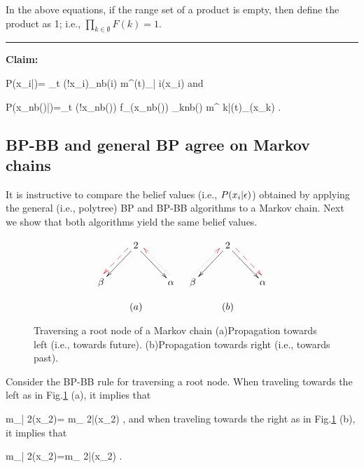 In the above
equations, if the
range set of a product is empty, then
 define the product as 1; i.e.,
$\prod_{k\in \emptyset}F(k)=1$.



\hrule\noindent
{\bf Claim:}

\beq
P(x_i|\eps)=
\lim_{t\rarrow
\infty}\caln(!x_i)\prod_{\alp\in nb(i)}
m^{(t)}_{\alp| i}(x_i)
\;
\label{eq-m-prod}
\eeq
and

\beq
P(x_{nb(\alp)}|\eps)=\lim_{t\rarrow \infty}
\caln(!x_{nb(\alp)})
f_\alp(x_{nb(\alp)})
\prod_{k\in nb(\alp)}
m^{ k|(t)}_{\alp}(x_k)
\;.
\label{eq-f-m-prod}
\eeq


\subsection{BP-BB and general BP agree on Markov chains}

It is instructive to
compare the belief values (i.e., $P(x_i|\epsilon)$)
obtained by
 applying the
general (i.e., polytree)  BP
and  BP-BB algorithms  to a Markov chain.
Next we show that both algorithms
yield the same belief values.

\begin{figure}[h!]
$$
\begin{array}{cc}
\xymatrix{
&2\ar[dr]\ar[dl]\ar@[red]@{-->}@<-1ex>[dl]
\\
\beta
&&\alp\ar@[red]@{.>}@<-1ex>[ul]
}
&
\xymatrix{
&2\ar[dr]\ar[dl]\ar@[red]@{-->}@<1ex>[dr]
\\
\beta\ar@[red]@{.>}@<1ex>[ur]
&&\alp
}
\\
\\
(a)&(b)
\end{array}
$$
\caption{Traversing a root node of a Markov chain
(a)Propagation towards left (i.e., towards future).
(b)Propagation towards right (i.e., towards past).}
\label{fig-mp-markov-trans-root}
\end{figure}

Consider
the BP-BB rule for traversing a root node.
When traveling
towards the left
as in Fig.\ref{fig-mp-markov-trans-root} (a),
it implies that

\beq
m_{\alp | 2}(x_2)= m_{ 2|\beta }(x_2)
\;,
\eeq
and
when traveling
towards the right
as in Fig.\ref{fig-mp-markov-trans-root} (b),
it implies that

\beq
m_{\beta| 2}(x_2)=m_{ 2|\alp}(x_2)
\;.
\eeq



